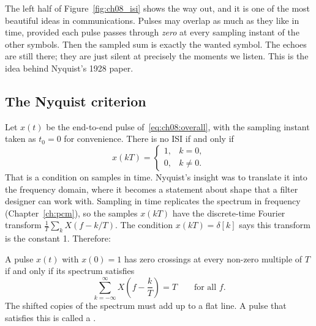 The left half of Figure~\ref{fig:ch08_isi} shows the way out, and it is one of the most
beautiful ideas in communications. Pulses may overlap as much as they like in time, provided
each pulse passes through \emph{zero} at every sampling instant of the other symbols. Then the
sampled sum is exactly the wanted symbol. The echoes are still there; they are just silent at
precisely the moments we listen. This is the idea behind Nyquist's 1928 paper.

\subsection{The Nyquist criterion}

Let $x(t)$ be the end-to-end pulse of~\eqref{eq:ch08:overall}, with the sampling instant taken
as $t_0=0$ for convenience. There is no ISI if and only if
\begin{equation}
x(kT)=\begin{cases}1,&k=0,\\0,&k\ne0.\end{cases}
\label{eq:ch08:nyqtime}
\end{equation}
That is a condition on samples in time. Nyquist's insight was to translate it into the frequency
domain, where it becomes a statement about shape that a filter designer can work with.
Sampling in time replicates the spectrum in frequency (Chapter~\ref{ch:pcm}), so the samples
$x(kT)$ have the discrete-time Fourier transform $\frac1T\sum_k X(f-k/T)$. The condition
$x(kT)=\delta[k]$ says this transform is the constant 1. Therefore:


\begin{keyidea}
A pulse $x(t)$ with $x(0)=1$ has zero crossings at every non-zero multiple of $T$ if and only if
its spectrum satisfies
\begin{equation}
\sum_{k=-\infty}^{\infty}X\!\left(f-\frac kT\right)=T\qquad\text{for all }f.
\label{eq:ch08:nyquist}
\end{equation}
The shifted copies of the spectrum must add up to a flat line. A pulse that satisfies this is
called a .
\end{keyidea}

